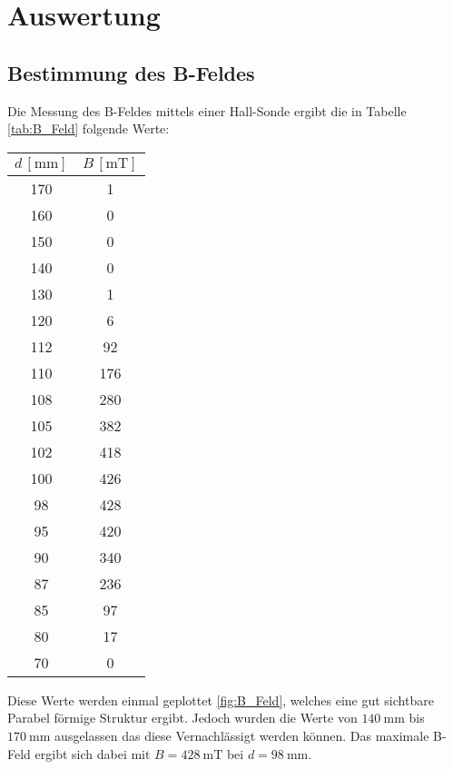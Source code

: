 \newpage
\section{Auswertung}
\subsection{Bestimmung des B-Feldes}
Die Messung des B-Feldes mittels einer Hall-Sonde ergibt die in Tabelle \eqref{tab:B_Feld} folgende Werte:

\begin{table}[H]
	\centering
	\begin{tabular}{c c}
		\toprule
		$d \, [\unit{\milli\meter}]$ & $B \, [\unit{\milli\tesla}] $  \\
		\midrule
        170 & 1 \\
        160 & 0 \\
        150 & 0 \\
        140 & 0 \\
        130 & 1 \\
        120 & 6 \\
        112 & 92 \\
        110 & 176 \\
        108 & 280 \\
        105 & 382 \\
        102 & 418 \\
        100 & 426 \\
        98  & 428 \\
        95  & 420 \\
        90  & 340 \\
        87  & 236 \\
        85  & 97 \\
        80  & 17 \\
        70  & 0  \\
		\bottomrule
	\end{tabular}
    \label{tab:B_Feld}
\end{table}

Diese Werte werden einmal geplottet \eqref{fig:B_Feld}, welches eine gut sichtbare Parabel förmige Struktur ergibt. 
Jedoch wurden die Werte von $\qty{140}{\milli\meter}$ bis $\qty{170}{\milli\meter}$ ausgelassen das diese Vernachlässigt werden können. 
Das maximale B-Feld ergibt sich dabei mit $B=\qty{428}{\milli\tesla}$ bei $d=\qty{98}{\milli\meter}$. 

